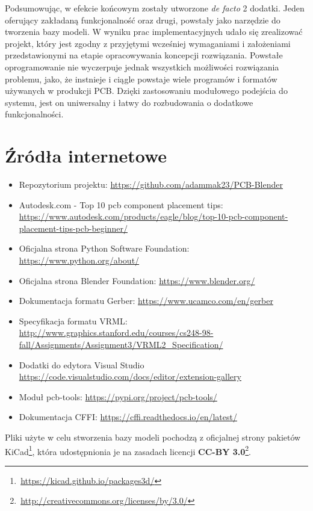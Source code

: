 \documentclass{xmgr}
\begin{document}
Podsumowując, w efekcie końcowym zostały utworzone \emph{de facto} 2 dodatki. Jeden oferujący zakładaną funkcjonalność oraz drugi, powstały jako narzędzie do tworzenia bazy modeli. W wyniku prac implementacyjnych udało się zrealizować projekt, który jest zgodny z przyjętymi wcześniej wymaganiami i założeniami przedstawionymi na etapie opracowywania koncepcji rozwiązania. Powstałe oprogramowanie nie wyczerpuje jednak wszystkich możliwości rozwiązania problemu, jako, że instnieje i ciągle powstaje wiele programów i formatów używanych w produkcji PCB. Dzięki zastosowaniu modułowego podejścia do systemu, jest on uniwersalny i łatwy do rozbudowania o dodatkowe funkcjonalności.






\listoffigures

\appendix
\chapter{Źródła internetowe} \label{linki}
\begin{itemize}
\item Repozytorium projektu: \url{https://github.com/adammak23/PCB-Blender}
\item Autodesk.com - Top 10 pcb component placement tips: \url{https://www.autodesk.com/products/eagle/blog/top-10-pcb-component-placement-tips-pcb-beginner/}
\item Oficjalna strona Python Software Foundation: \url{https://www.python.org/about/}
\item Oficjalna strona Blender Foundation: \url{https://www.blender.org/}
\item Dokumentacja formatu Gerber: \url{https://www.ucamco.com/en/gerber}
\item Specyfikacja formatu VRML: \url{http://www.graphics.stanford.edu/courses/cs248-98-fall/Assignments/Assignment3/VRML2_Specification/}
\item Dodatki do edytora Visual Studio \url{https://code.visualstudio.com/docs/editor/extension-gallery}
\item Moduł pcb-tools: \url{https://pypi.org/project/pcb-tools/}
\item Dokumentacja CFFI: \url{https://cffi.readthedocs.io/en/latest/}
\end{itemize}

\vspace{20mm}

\noindent Pliki użyte w celu stworzenia bazy modeli pochodzą z oficjalnej strony pakietów KiCad\footnote{\,\url{https://kicad.github.io/packages3d/}}, która udostępnionia je na zasadach licencji \textbf{CC-BY 3.0}\footnote{\,\url{http://creativecommons.org/licenses/by/3.0/}}.
\vspace{5mm}


\oswiadczenie
\end{document}
